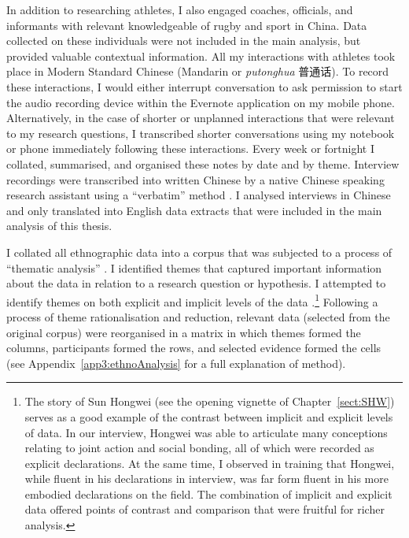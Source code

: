 \begin{CJK}{UTF8}{gbsn}
 In addition to researching athletes, I also engaged coaches, officials, and informants with relevant knowledgeable of rugby and sport in China. Data collected on these individuals were not included in the main analysis, but provided valuable contextual information.
 All my interactions with athletes took place in Modern Standard Chinese (Mandarin or \textit{putonghua} 普通话).  To record these interactions, I would either interrupt conversation to ask permission to start the audio recording device within the Evernote application on my mobile phone.  Alternatively, in the case of shorter or unplanned interactions that were relevant to my research questions,  I transcribed shorter conversations using my notebook or phone immediately following these interactions.  Every week or fortnight I collated, summarised, and organised these notes by date and by theme.  Interview recordings were transcribed into written Chinese by a native Chinese speaking research assistant using a ``verbatim'' method \citep[i.e., including an account of all verbal and important nonverbal (coughs, pauses, etc.) utterances, see][269-70]{Poland2003}.  I analysed interviews in Chinese and only translated into English data extracts that were included in the main analysis of this thesis.

 I collated all ethnographic data into a corpus that was subjected to a process of ``thematic analysis'' \citep{Braun2006}. I identified themes that captured important information about the data in relation to a research question or hypothesis.  I attempted to identify themes on both explicit and implicit levels of the data \citep{Boyatzis1998}.\footnote{The story of Sun Hongwei (see the opening vignette of Chapter~\ref{sect:SHW}) serves as a good example of the contrast between implicit and explicit levels of data.  In our interview, Hongwei was able to articulate many conceptions relating to joint action and social bonding, all of which were recorded as explicit declarations.  At the same time, I observed in training that Hongwei, while fluent in his declarations in interview, was far form fluent in his more embodied declarations on the field.  The combination of implicit and explicit data offered points of contrast and comparison that were fruitful for richer analysis.}  Following a process of theme rationalisation and reduction,
 relevant data (selected from the original corpus) were reorganised in a matrix in which themes formed the columns, participants formed the rows, and selected evidence formed the cells (see Appendix~\ref{app3:ethnoAnalysis} for a full explanation of method).



\end{CJK}
